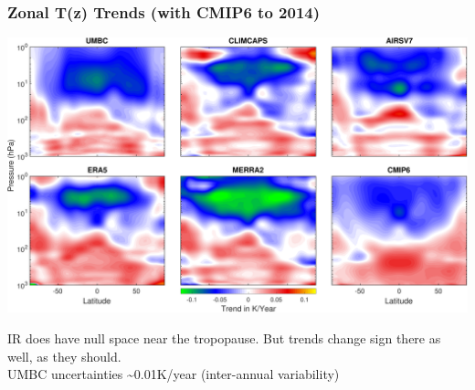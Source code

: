 \documentclass[10pt,t]{beamer}
\begin{document}
\begin{frame}
\frametitle{Zonal T(z) Trends (with CMIP6 to 2014)}  
\vspace{-0.15in}
\begin{center}
\includegraphics[width=\linewidth]{SunClimate2022/zonal_trates_1to1000mbar_cmip6_newcaxis.pdf}
\end{center}

\footnotesize
IR does have null space near the tropopause.  But trends change sign there as well, as they should.\\
\vspace{0.1in}
UMBC uncertainties \textasciitilde{}0.01K/year (inter-annual variability)
\end{frame}
\end{document}
